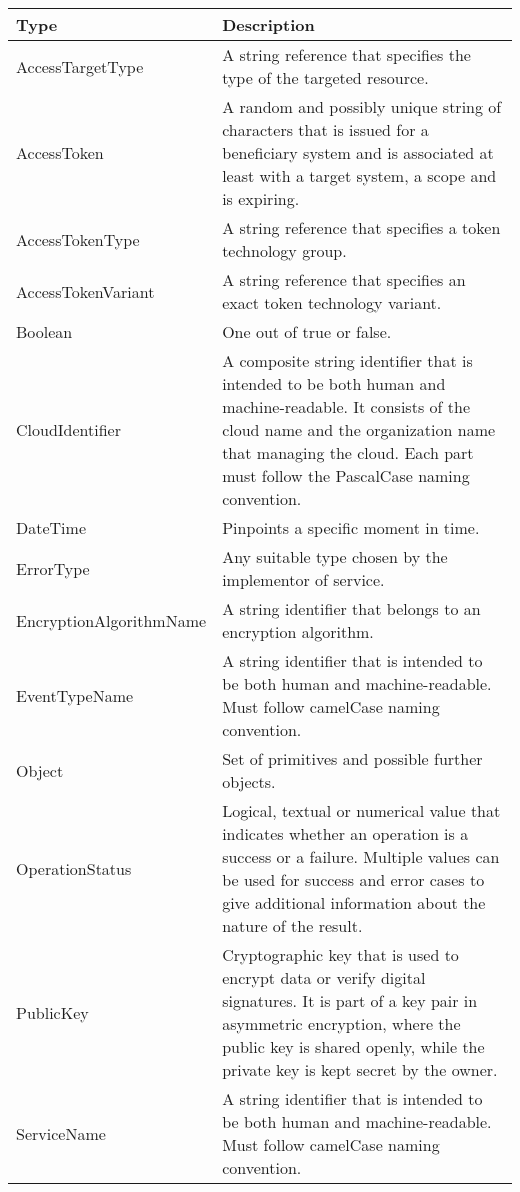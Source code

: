 \documentclass[a4paper]{arrowhead}
\newcommand{\pdef}[1]{{\textcolor{ArrowheadGrey}{#1\label{sec:model:primitives:#1}\label{sec:model:primitives:#1s}\label{sec:model:primitives:#1es}}}}
\begin{document}
\begin{table}[ht!]
\begin{tabularx}{\textwidth}{| p{5cm} | X |} \hline
\rowcolor{gray!33} Type & Description \\ \hline
\pdef{AccessTargetType} & A string reference that specifies the type of the targeted resource. \\ \hline
\pdef{AccessToken} & A random and possibly unique string of characters that is issued for a beneficiary system and is associated at least with a target system, a scope and is expiring.\\ \hline
\pdef{AccessTokenType} & A string reference that specifies a token technology group.\\ \hline
\pdef{AccessTokenVariant} & A string reference that specifies an exact token technology variant.\\ \hline
\pdef{Boolean}          & One out of true or false. \\ \hline
\pdef{CloudIdentifier} & A composite string identifier that is intended to be both human and machine-readable. It consists of the cloud name and the organization name that managing the cloud. Each part must follow the PascalCase naming convention. \\ \hline
\pdef{DateTime}         & Pinpoints a specific moment in time. \\ \hline
\pdef{ErrorType}        & Any suitable type chosen by the implementor of service. \\ \hline
\pdef{EncryptionAlgorithmName} & A string identifier that belongs to an encryption algorithm. \\ \hline
\pdef{EventTypeName}      & A string identifier that is intended to be both human and machine-readable. Must follow camelCase naming convention. \\ \hline
\pdef{Object}           & Set of primitives and possible further objects. \\ \hline
\pdef{OperationStatus}  & Logical, textual or numerical value that indicates whether an operation is a success or a failure. Multiple values can be used for success and error cases to give additional information about the nature of the result. \\ \hline
\pdef{PublicKey} & Cryptographic key that is used to encrypt data or verify digital signatures. It is part of a key pair in asymmetric encryption, where the public key is shared openly, while the private key is kept secret by the owner. \\ \hline
\pdef{ServiceName}      & A string identifier that is intended to be both human and machine-readable. Must follow camelCase naming convention. \\ \hline

\end{tabularx}
\end{table}
\end{document}
